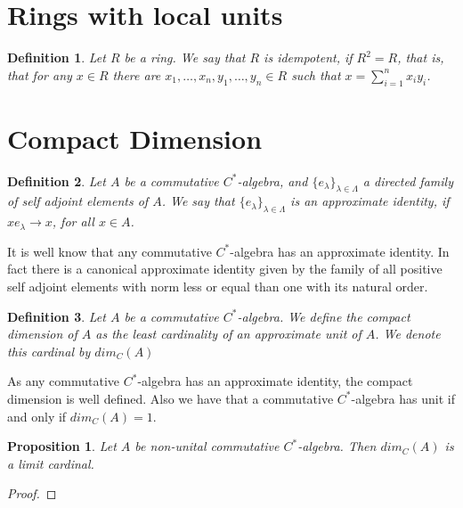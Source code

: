 \documentclass{amsart}
\newtheorem{proposition}{Proposition}[section]
\newtheorem{definition}{Definition}[section]
\begin{document}
\section{Rings with local units}
\begin{definition}
Let $R$ be a ring. We say that $R$ is idempotent, if $R^2=R$, that is, that for any $x\in R$ there are $x_1,\dots,x_n,y_1,\dots,y_n\in R$ such that $x=\sum_{i=1}^nx_iy_i$.
\end{definition}

\section{Compact Dimension}

\begin{definition}
Let $A$ be a commutative $C^*$-algebra, and $\{e_\lambda\}_{\lambda\in\Lambda}$ a directed family of self adjoint elements of $A$. We say that $\{e_\lambda\}_{\lambda\in\Lambda}$ is an approximate identity, if $xe_\lambda\rightarrow x$, for all $x\in A$.
\end{definition}

It is well know that any commutative $C^*$-algebra has an approximate identity. In fact there is a canonical approximate identity given by the family of all positive self adjoint elements with norm less or equal than one with its natural order.

\begin{definition}
Let $A$ be a commutative $C^*$-algebra. We define the compact dimension of $A$ as the least cardinality of an approximate unit of $A$. We denote this cardinal by $dim_C(A)$
\end{definition}

As any commutative $C^*$-algebra has an approximate identity, the compact dimension is well defined. Also we have that a commutative $C^*$-algebra has unit if and only if $dim_C(A)=1$.

\begin{proposition}
Let $A$ be non-unital commutative $C^*$-algebra. Then $dim_C(A)$ is a limit cardinal.
\end{proposition}

\begin{proof}

\end{proof}

\end{document}
